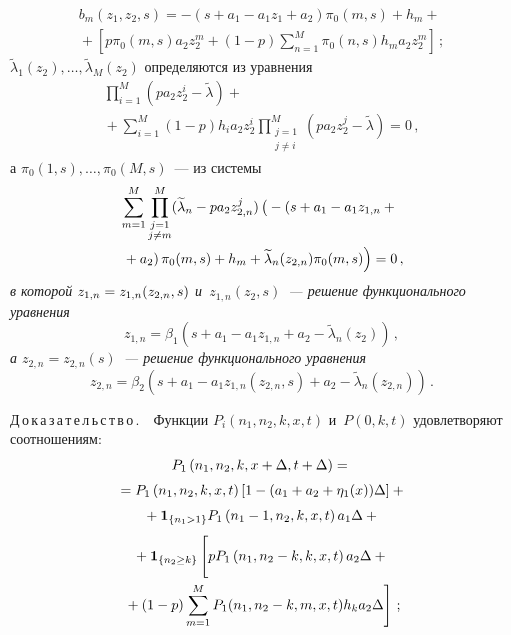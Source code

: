 \begin{multicols}{2}
\vspace*{-9pt}

\noindent
\begin{multline*}
\!\!\!\!b_m\!\left(z_1,z_2,s\right)=-\left(s+a_1-a_1 z_1+a_2\right)\!\pi_0(m,s)+h_m+{}\\
{}+\left[p\pi_0
(m,s)a_2 z_2^m+(1-p)\sum\limits_{n=1}^{M}\pi_0(n,s)h_m a_2 z_2^m\right]\,;
\end{multline*}
$\widetilde{\lambda}_1(z_2),\ldots,\widetilde{\lambda}_M(z_2)$ 
определяются из уравнения
\begin{multline*}
\prod\limits_{i=1}^M\left(pa_2 z_2^i-\widetilde{\lambda}\right)+{}\\
{}+
\sum\limits_{i=1}^M \left(1-p\right) h_i a_2 z_2^i
\prod\limits_{\substack{j=1\\j\neq i}}^M
\left(pa_2 z_2^j-\widetilde{\lambda}\right)=0\,,
\end{multline*}
а $\pi_0(1,s),\ldots,\pi_0(M,s)$~--- из системы
\begin{multline*}
\sum\limits_{m=1}^M
\prod\limits_{\substack{j=1\\
j\neq m}}^M(\widetilde{\lambda}_n-pa_2 z_{2,n}^j)
\left(
\vphantom{\tilde{\lambda}_n}
-\left(s+a_1-a_1 z_{1,n}+{}\right.\right.\\
\left.\left.{}+a_2\right)
\pi_0(m,s)+h_m+\widetilde{\lambda}_n(z_{2,n})\pi_0(m,s)\right)=0\,,
\end{multline*}
\textit{в которой $z_{1,n}\hm=z_{1,n}(z_{2,n},s)$ и~$z_{1,n}(z_2,s)$~--- 
решение функционального уравнения}
\begin{equation*}
z_{1,n}=\beta_1\left(s+a_1-a_1 z_{1,n}+a_2-\widetilde{\lambda}_n\left(z_2\right)\right)\,,
\end{equation*}
\textit{а $z_{2,n}=z_{2,n}(s)$~--- решение функционального урав\-нения}
\begin{equation*}
z_{2,n}=\beta_2\left(s+a_1-a_1 z_{1,n}(z_{2,n},s)+a_2-\widetilde{\lambda}_n
\left(z_{2,n}\right)\right)\,.
\end{equation*}

\noindent
Д\,о\,к\,а\,з\,а\,т\,е\,л\,ь\,с\,т\,в\,о\,.\ \
 Функции $P_i(n_1,n_2,k,x,t)$ и~$P(0,k,t)$ удовлетворяют соотношениям:
\begin{multline}
P_1\left(n_1,n_2,k,x+\Delta,t+\Delta\right)={}\\[3pt]
{}=P_1\left(n_1,n_2,k,x,t\right)
\left[1-(a_1+a_2+\eta_1(x))\Delta\right]+{}\\[3pt]
{}+\mathbf{1}_{\{n_1>1\}}P_1\left(n_1-1,n_2,k,x,t\right)a_1\Delta+{}\\[3pt]
{}+\mathbf{1}_{\{n_2\geq k\}}\left[
\vphantom{\sum\limits_{m=1}^{M}}
pP_1\left(n_1,n_2-k,k,x,t\right)a_2\Delta+{}\right.\\
\left.{}+(1-p)
\sum\limits_{m=1}^{M}P_1(n_1,n_2-k,m,x,t)h_k a_2\Delta\right]\,;\label{before1}
\end{multline}


\end{multicols}
